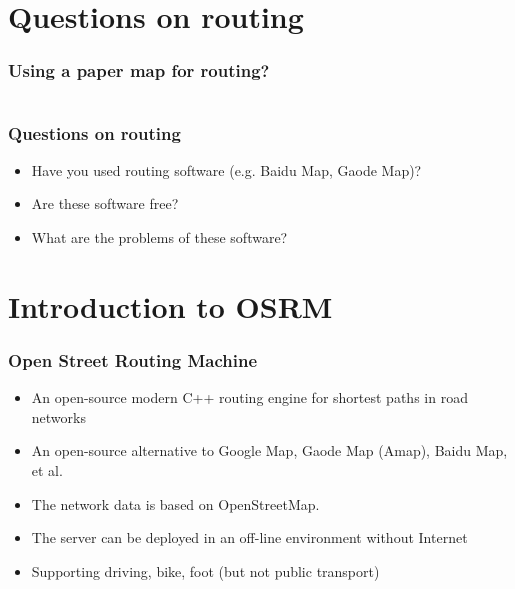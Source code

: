 \documentclass{beamer}
\begin{document}
\section{Questions on routing}
\begin{frame}
\frametitle{Using a paper map for routing?}
\begin{columns}[T]
  \end{columns}
\end{frame}
\begin{frame}
\frametitle{Questions on routing}
  \begin{itemize}
  \item Have you used routing software (e.g. Baidu Map, Gaode Map)?
  \item Are these software free?
  \item What are the problems of these software?
  \end{itemize}
\end{frame}
\section{Introduction to OSRM}

\begin{frame}
\frametitle{Open Street Routing Machine}
  \begin{itemize}
  \item An open-source modern C++ routing engine for shortest paths in road networks
  \item An open-source alternative to Google Map, Gaode Map (Amap), Baidu Map, et al.
  \item The network data is based on OpenStreetMap.
  \item The server can be deployed in an off-line environment without Internet
  \item Supporting driving, bike, foot (but not public transport)
  \end{itemize}
\end{frame}
\end{document}
